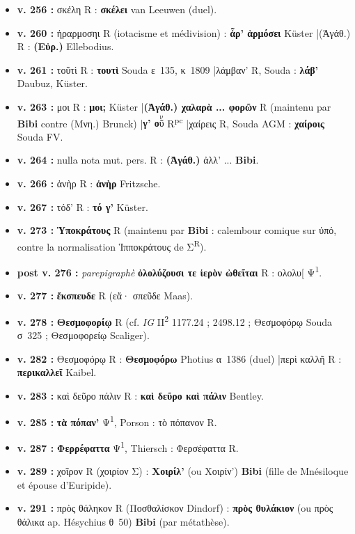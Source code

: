 \documentclass[10pt, a4paper, twoside]{book}
\renewcommand{\_}{\origunderscore\penalty0\relax}
\providecommand{\italique}[1]{\emph{#1}}
\providecommand{\lecon}[1]{\textbf{#1}}
\providecommand{\expo}[1]{\textsuperscript{#1}}
\providecommand{\Rpc}{R\expo{pc}}
\providecommand{\PsiUn}{\textgreek{Ψ}\textsuperscript{1}}
\providecommand{\espApp}{\hspace{0.5em}|\hspace{0.5em}}
\providecommand{\auDessus}[2]{\ensuremath{\overset{\text{#2}}{\text{#1}}}}
\begin{document}
\begin{itemize}
\begin{itemize}
    \item \textbf{v. 256 :} σκέλη R : \lecon{σκέλει} van Leeuwen (duel).
    \item \textbf{v. 260 :} ἠραρμοσηι R (iotacisme et médivision) : \lecon{ἆρ' ἁρμόσει} Küster \espApp (Ἀγάθ.) R : \lecon{(Εὐρ.)} Ellebodius.
    \item \textbf{v. 261 :} τοῦτὶ R : \lecon{τουτὶ} Souda ε~135, κ~1809 \espApp λάμβαν' R, Souda : \lecon{λάβ'} Daubuz, Küster.
    \item \textbf{v. 263 :} μοι R : \lecon{μοι;} Küster \espApp \textbf{(Ἀγάθ.) χαλαρὰ ... φορῶν} R (maintenu par \textbf{Bibi} contre (Μνη.) Brunck) \espApp \lecon{γ' ο\auDessus{ῦ}{ν}} \Rpc{} \espApp χαίρεις R, Souda AGM : \lecon{χαίροις} Souda FV.
    \item \textbf{v. 264 :} nulla nota mut. pers. R : \lecon{(Ἀγάθ.)} ἀλλ' ... \lecon{Bibi}.
    \item \textbf{v. 266 :} ἀνὴρ R : \lecon{ἁνὴρ} Fritzsche.
    \item \textbf{v. 267 :} τόδ' R : \lecon{τό γ'} Küster.
    \item \textbf{v. 273 :} \lecon{Ὑποκράτους} R (maintenu par \textbf{Bibi} : calembour comique sur ὑπό, contre la normalisation Ἱπποκράτους de Σ\textsuperscript{R}).
    \item \textbf{post v. 276 :} \italique{parepigraphè} \lecon{ὀλολύζουσι τε ἱερὸν ὠθεῖται} R : ολολυ[ \PsiUn{}.
    \item \textbf{v. 277 :} \lecon{ἔκσπευδε} R (εἄ· σπεῦδε Maas).
    \item \textbf{v. 278 :} \lecon{Θεσμοφορίῳ} R (cf. \italique{IG} II\expo{2} 1177.24 ; 2498.12 ; Θεσμοφόρῳ Souda σ~325 ; Θεσμοφορείῳ Scaliger).
    \item \textbf{v. 282 :} Θεσμοφόρῳ R : \lecon{Θεσμοφόρω} Photius α~1386 (duel) \espApp περὶ καλλῆ R : \lecon{περικαλλεῖ} Kaibel.
    \item \textbf{v. 283 :} καὶ δεῦρο πάλιν R : \lecon{καὶ δεῦρο καὶ πάλιν} Bentley.
    \item \textbf{v. 285 :} \lecon{τὰ πόπαν'} \PsiUn{}, Porson : τὸ πόπανον R.
    \item \textbf{v. 287 :} \lecon{Φερρέφαττα} \PsiUn{}, Thiersch : Φερσέφαττα R.
    \item \textbf{v. 289 :} χοῖρον R (χοιρίον Σ) : \lecon{Χοιρίλ'} (ou Χοιρίν') \lecon{Bibi} (fille de Mnésiloque et épouse d'Euripide).
    \item \textbf{v. 291 :} πρὸς θάληκον R (Ποσθαλίσκον Dindorf) : \lecon{πρὸς θυλάκιον} (ou πρὸς θάλικα ap. Hésychius θ~50) \lecon{Bibi} (par métathèse).
  \end{itemize}
\end{itemize}
\end{document}

